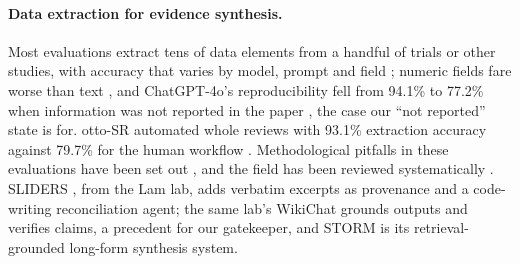 \documentclass{article} %
\begin{document}
\paragraph{Data extraction for evidence synthesis.} Most evaluations extract tens of data elements from a handful of trials or other studies, with accuracy that varies by model, prompt and field \citep{gartlehner2024_llm_extraction,Konet2024PerformanceTwo,Liu2025AidrivenEvidence,Schmidt2024ExploringUse,Mahmoudi2025CriticalAssessment,Khan2025CollaborativeLarge,kataoka2025_gpt4o_o3_extraction}; numeric fields fare worse than text \citep{kataoka2025_gpt4o_o3_extraction}, and ChatGPT-4o's reproducibility fell from 94.1\% to 77.2\% when information was not reported in the paper \citep{Jensen2025Chatgpt4oCan}, the case our ``not reported'' state is for. otto-SR automated whole reviews with 93.1\% extraction accuracy against 79.7\% for the human workflow \citep{cao2025_ottosr}. Methodological pitfalls in these evaluations have been set out \citep{Gartlehner2024FromPromise}, and the field has been reviewed systematically \citep{Shankar2026PerformanceLarge}. SLIDERS \citep{joshi2026_sliders}, from the Lam lab, adds verbatim excerpts as provenance and a code-writing reconciliation agent; the same lab's WikiChat \citep{semnani2023_wikichat} grounds outputs and verifies claims, a precedent for our gatekeeper, and STORM \citep{shao2024_storm} is its retrieval-grounded long-form synthesis system.
\end{document}
